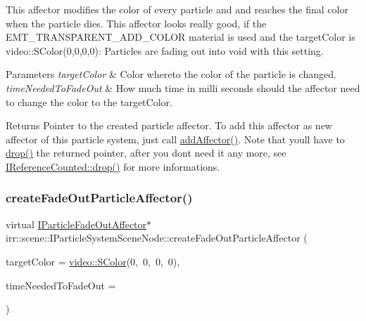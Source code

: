 This affector modifies the color of every particle and and reaches the final color when the particle dies. This affector looks really good, if the E\+M\+T\+\_\+\+T\+R\+A\+N\+S\+P\+A\+R\+E\+N\+T\+\_\+\+A\+D\+D\+\_\+\+C\+O\+L\+OR material is used and the target\+Color is video\+::\+S\+Color(0,0,0,0)\+: Particles are fading out into void with this setting. 
\begin{DoxyParams}{Parameters}
{\em target\+Color} & Color whereto the color of the particle is changed. \\
\hline
{\em time\+Needed\+To\+Fade\+Out} & How much time in milli seconds should the affector need to change the color to the target\+Color. \\
\hline
\end{DoxyParams}
\begin{DoxyReturn}{Returns}
Pointer to the created particle affector. To add this affector as new affector of this particle system, just call \hyperlink{classirr_1_1scene_1_1IParticleSystemSceneNode_a401f5afbbb748878011c5ceb7d447f8b}{add\+Affector()}. Note that you\textquotesingle{}ll have to \hyperlink{classirr_1_1IReferenceCounted_a03856a09355b89d178090c4a5f738543}{drop()} the returned pointer, after you don\textquotesingle{}t need it any more, see \hyperlink{classirr_1_1IReferenceCounted_a03856a09355b89d178090c4a5f738543}{I\+Reference\+Counted\+::drop()} for more informations. 
\end{DoxyReturn}
\mbox{\label{classirr_1_1scene_1_1IParticleSystemSceneNode_a4a9c3ecdf6118267f312f9389bb24888}} 
\subsubsection{\texorpdfstring{create\+Fade\+Out\+Particle\+Affector()}{createFadeOutParticleAffector()}\hspace{0.1cm}{\footnotesize\ttfamily [2/2]}}
{\footnotesize\ttfamily virtual \hyperlink{classirr_1_1scene_1_1IParticleFadeOutAffector}{I\+Particle\+Fade\+Out\+Affector}$\ast$ irr\+::scene\+::\+I\+Particle\+System\+Scene\+Node\+::create\+Fade\+Out\+Particle\+Affector (\begin{DoxyParamCaption}\item[{const \hyperlink{classirr_1_1video_1_1SColor}{video\+::\+S\+Color} \&}]{target\+Color = {\ttfamily \hyperlink{classirr_1_1video_1_1SColor}{video\+::\+S\+Color}(0,~0,~0,~0)},  }\item[{\hyperlink{namespaceirr_a0416a53257075833e7002efd0a18e804}{u32}}]{time\+Needed\+To\+Fade\+Out = {} }\end{DoxyParamCaption})\hspace{0.3cm}{\ttfamily [pure virtual]}}




